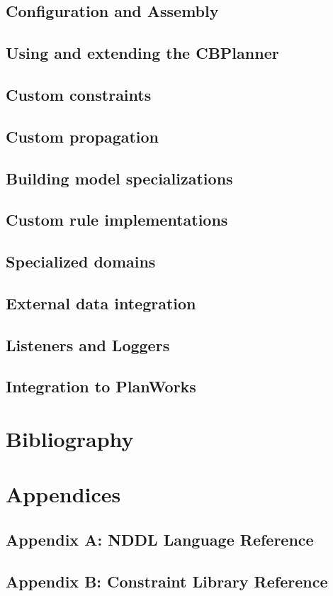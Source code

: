 \documentclass[10pt, letterpaper, twoside]{article}
\begin{document}
\subsection{Configuration and Assembly}
\subsection{Using and extending the CBPlanner}
\subsection{Custom constraints}
\subsection{Custom propagation}
\subsection{Building model specializations}
\subsection{Custom rule implementations}
\subsection{Specialized domains}
\subsection{External data integration}
\subsection{Listeners and Loggers}
\subsection{Integration to PlanWorks}

\section{Bibliography}

\section{Appendices}
\subsection{Appendix A: NDDL Language Reference}
\subsection{Appendix B: Constraint Library Reference}
\end{document}
